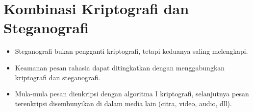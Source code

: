 \documentclass{article}
\begin{document}

\section*{Kombinasi Kriptografi dan Steganografi}

\begin{itemize}
    \item Steganografi bukan pengganti kriptografi, tetapi keduanya saling melengkapi.
    \item Keamanan pesan rahasia dapat ditingkatkan dengan menggabungkan kriptografi dan steganografi.
    \item Mula-mula pesan dienkripsi dengan algoritma I kriptografi, selanjutnya pesan terenkripsi disembunyikan di dalam media lain (citra, video, audio, dll).
\end{itemize}
\end{document}
